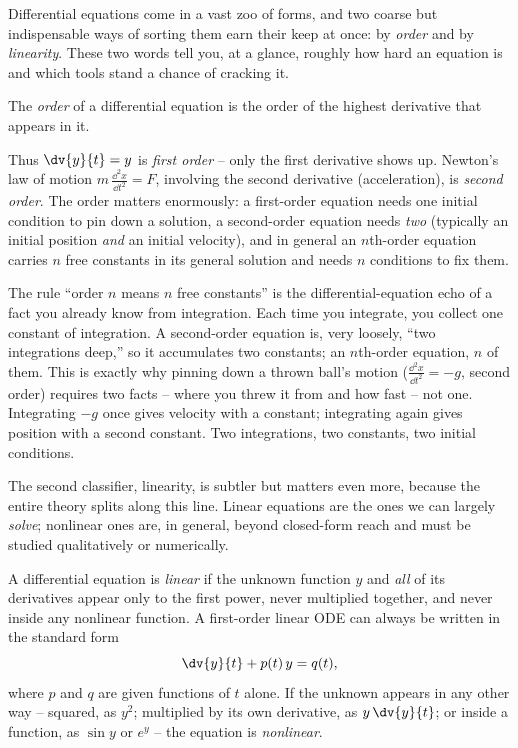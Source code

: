Differential equations come in a vast zoo of forms, and two coarse but indispensable ways of sorting them earn their keep at once: by \emph{order} and by \emph{linearity}. These two words tell you, at a glance, roughly how hard an equation is and which tools stand a chance of cracking it.

\begin{definition}[Order]
\label{ch36:def-order}
The \emph{order} of a differential equation is the order of the highest derivative that appears in it.
\end{definition}

Thus $\dv{y}{t} = y$ is \emph{first order} -- only the first derivative shows up. Newton's law of motion $m\,\frac{\dd^2 x}{\dd t^2} = F$, involving the second derivative (acceleration), is \emph{second order}. The order matters enormously: a first-order equation needs one initial condition to pin down a solution, a second-order equation needs \emph{two} (typically an initial position \emph{and} an initial velocity), and in general an $n$th-order equation carries $n$ free constants in its general solution and needs $n$ conditions to fix them.

\begin{connectionbox}
The rule ``order $n$ means $n$ free constants'' is the differential-equation echo of a fact you already know from integration. Each time you integrate, you collect one constant of integration. A second-order equation is, very loosely, ``two integrations deep,'' so it accumulates two constants; an $n$th-order equation, $n$ of them. This is exactly why pinning down a thrown ball's motion ($\frac{\dd^2 x}{\dd t^2} = -g$, second order) requires two facts -- where you threw it from and how fast -- not one. Integrating $-g$ once gives velocity with a constant; integrating again gives position with a second constant. Two integrations, two constants, two initial conditions.
\end{connectionbox}

The second classifier, linearity, is subtler but matters even more, because the entire theory splits along this line. Linear equations are the ones we can largely \emph{solve}; nonlinear ones are, in general, beyond closed-form reach and must be studied qualitatively or numerically.

\begin{definition}
\label{ch36:def-linear}
A differential equation is \emph{linear} if the unknown function $y$ and \emph{all} of its derivatives appear only to the first power, never multiplied together, and never inside any nonlinear function. A first-order linear ODE can always be written in the standard form
\[
  \dv{y}{t} + p(t)\,y = q(t),
\]
where $p$ and $q$ are given functions of $t$ alone. If the unknown appears in any other way -- squared, as $y^2$; multiplied by its own derivative, as $y\,\dv{y}{t}$; or inside a function, as $\sin y$ or $e^{y}$ -- the equation is \emph{nonlinear}.
\end{definition}

